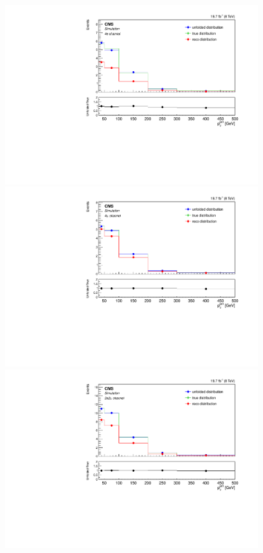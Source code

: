\begin{figure}[hbtp]
\begin{center}
    \includegraphics[width=0.8\cmsFigWidth]{Figures/Unfolding/MCTests/PtJet1_ZZTo4e_PowMatrix_PowDistr_HalfSample_fr}     
    \includegraphics[width=0.8\cmsFigWidth]{Figures/Unfolding/MCTests/PtJet1_ZZTo4m_PowMatrix_PowDistr_HalfSample_fr}     
 \includegraphics[width=0.8\cmsFigWidth]{Figures/Unfolding/MCTests/PtJet1_ZZTo2e2m_PowMatrix_PowDistr_HalfSample_fr}        

\end{center}
\end{figure}
